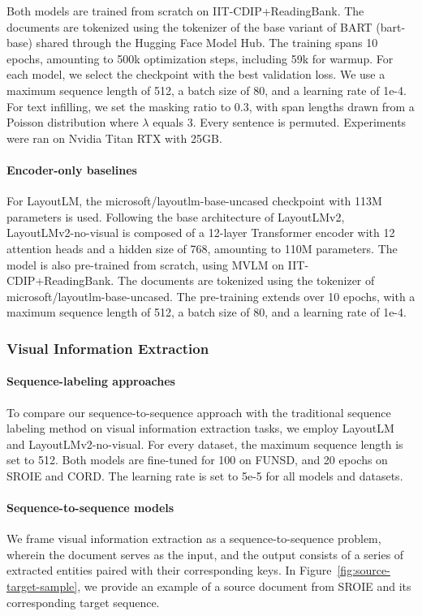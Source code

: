 Both models are trained from scratch on IIT-CDIP+ReadingBank. The documents are tokenized 
using the tokenizer of the base variant of \ac{BART} (bart-base) shared through the Hugging Face Model Hub. The training spans 10 epochs, amounting to 500k optimization steps, including 59k for warmup. For each model, we select the checkpoint with the best validation loss. We use a maximum sequence length of 512, a batch size of 80, and a learning rate of 1e-4. For text infilling, we set the masking ratio to 0.3, with span lengths drawn from a Poisson distribution where $\lambda$ equals 3. Every sentence is permuted. Experiments were ran on Nvidia Titan RTX with 25GB. 

\paragraph{Encoder-only baselines} For LayoutLM, the microsoft/layoutlm-base-uncased checkpoint with 113M parameters is used. Following the base architecture of LayoutLMv2, LayoutLMv2-no-visual is composed of a 12-layer Transformer encoder with 12 attention heads and a hidden size of 768, amounting to 110M parameters. The model is also pre-trained from scratch, using \ac{MVLM} on IIT-CDIP+ReadingBank. The documents are tokenized using the tokenizer of microsoft/layoutlm-base-uncased. The pre-training extends over 10 epochs, with a maximum sequence length of 512, a batch size of 80, and a learning rate of 1e-4.


\subsubsection{Visual Information Extraction}

\paragraph{Sequence-labeling approaches}

To compare our sequence-to-sequence approach with the traditional sequence labeling method on visual information extraction tasks, we employ LayoutLM and LayoutLMv2-no-visual. For every dataset, the maximum sequence length is set to 512. Both models are fine-tuned for 100 on FUNSD, and 20 epochs on SROIE and CORD. The learning rate is set to 5e-5 for all models and datasets.

\paragraph{Sequence-to-sequence models} We frame visual information extraction as a sequence-to-sequence problem, wherein the document serves as the input, and the output consists of a series of extracted entities paired with their corresponding keys. In Figure~\ref{fig:source-target-sample}, we provide an example of a source document from SROIE and its corresponding target sequence. 

